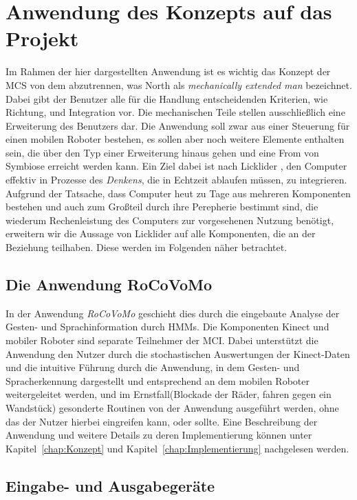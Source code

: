 \section{Anwendung des Konzepts auf das Projekt}
Im Rahmen der hier dargestellten Anwendung ist es wichtig das Konzept der \gls{MCS} von dem abzutrennen, was North \cite{bib:TODO_North} als \textit{mechanically extended man} bezeichnet. Dabei gibt der Benutzer alle f\"ur die Handlung entscheidenden Kriterien, wie Richtung, und Integration vor. Die mechanischen Teile stellen ausschlie\ss lich eine Erweiterung des Benutzers dar. Die Anwendung soll zwar aus einer Steuerung f\"ur einen mobilen Roboter bestehen, es sollen aber noch weitere Elemente enthalten sein, die \"uber den Typ einer Erweiterung hinaus gehen und eine From von Symbiose erreicht werden kann.
\newline
Ein Ziel dabei ist nach Licklider \cite{bib:Lick_Symbiosis}, den Computer effektiv in Prozesse des \textit{Denkens}, die in Echtzeit ablaufen m\"ussen, zu integrieren. Aufgrund der Tatsache, dass Computer heut zu Tage aus mehreren Komponenten bestehen und auch zum Gro\ss teil durch ihre Perepherie bestimmt sind, die wiederum Rechenleistung des Computers zur vorgesehenen Nutzung ben\"otigt, erweitern wir die  Aussage von Licklider auf alle Komponenten, die an der Beziehung teilhaben. Diese werden im Folgenden n\"aher betrachtet.

\subsection{Die Anwendung RoCoVoMo}
In der Anwendung \textit{RoCoVoMo} geschieht dies durch die eingebaute Analyse der Gesten- und Sprachinformation durch \glspl{HMM}. Die Komponenten Kinect und mobiler Roboter sind separate Teilnehmer der \gls{MCI}. Dabei unterst\"utzt die Anwendung den Nutzer durch die stochastischen Auswertungen der Kinect-Daten und die intuitive F\"uhrung durch die Anwendung, in dem Gesten- und Spracherkennung dargestellt und entsprechend an dem mobilen Roboter weitergeleitet werden, und im Ernstfall(Blockade der R\"ader, fahren gegen ein Wandst\"uck) gesonderte Routinen von der Anwendung ausgef\"uhrt werden, ohne das der Nutzer hierbei eingreifen kann, oder sollte. Eine Beschreibung der Anwendung und weitere Details zu deren Implementierung k\"onnen unter Kapitel~\ref{chap:Konzept} und Kapitel~\ref{chap:Implementierung} nachgelesen werden.

\subsection{Eingabe- und Ausgabeger\"ate}
